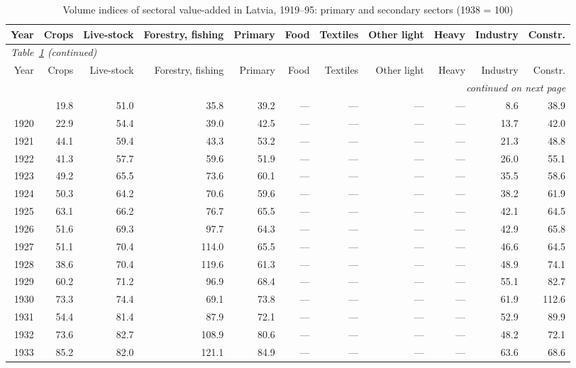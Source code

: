 \setlength{\tabcolsep}{3pt}
\begin{longtable}{r*{10}{r}}
\caption{Volume indices of sectoral value-added in Latvia, 1919--95: primary and secondary sectors (1938 = 100)}\label{tab:appsec1}\\
\toprule
Year & Crops & Live-stock & Forestry, fishing & Primary & Food & Textiles & Other light & Heavy & Industry & Constr. \\
\midrule
\endfirsthead
\multicolumn{11}{l}{\textit{Table~\ref{tab:appsec1} (continued)}} \\ \toprule
Year & Crops & Live-stock & Forestry, fishing & Primary & Food & Textiles & Other light & Heavy & Industry & Constr. \\
\midrule
\endhead
\midrule \multicolumn{11}{r}{\textit{continued on next page}} \\
\endfoot
\bottomrule
\endlastfoot
1919 & 19.8 & 51.0 & 35.8 & 39.2 & --- & --- & --- & --- & 8.6 & 38.9 \\
1920 & 22.9 & 54.4 & 39.0 & 42.5 & --- & --- & --- & --- & 13.7 & 42.0 \\
1921 & 44.1 & 59.4 & 43.3 & 53.2 & --- & --- & --- & --- & 21.3 & 48.8 \\
1922 & 41.3 & 57.7 & 59.6 & 51.9 & --- & --- & --- & --- & 26.0 & 55.1 \\
1923 & 49.2 & 65.5 & 73.6 & 60.1 & --- & --- & --- & --- & 35.5 & 58.6 \\
1924 & 50.3 & 64.2 & 70.6 & 59.6 & --- & --- & --- & --- & 38.2 & 61.9 \\
1925 & 63.1 & 66.2 & 76.7 & 65.5 & --- & --- & --- & --- & 42.1 & 64.5 \\
1926 & 51.6 & 69.3 & 97.7 & 64.3 & --- & --- & --- & --- & 42.9 & 65.8 \\
1927 & 51.1 & 70.4 & 114.0 & 65.5 & --- & --- & --- & --- & 46.6 & 64.5 \\
1928 & 38.6 & 70.4 & 119.6 & 61.3 & --- & --- & --- & --- & 48.9 & 74.1 \\
1929 & 60.2 & 71.2 & 96.9 & 68.4 & --- & --- & --- & --- & 55.1 & 82.7 \\
1930 & 73.3 & 74.4 & 69.1 & 73.8 & --- & --- & --- & --- & 61.9 & 112.6 \\
1931 & 54.4 & 81.4 & 87.9 & 72.1 & --- & --- & --- & --- & 52.9 & 89.9 \\
1932 & 73.6 & 82.7 & 108.9 & 80.6 & --- & --- & --- & --- & 48.2 & 72.1 \\
1933 & 85.2 & 82.0 & 121.1 & 84.9 & --- & --- & --- & --- & 63.6 & 68.6 \\

\end{longtable}
